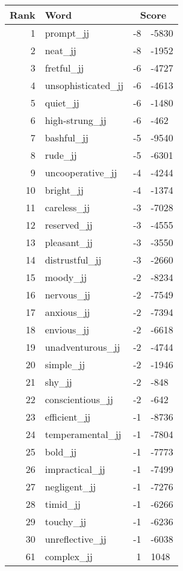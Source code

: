\begin{longtable}[!htbp]{| rlr@{.}l |}
    \hline
    \textbf{Rank} & \textbf{Word} & \multicolumn{2}{c|}{\textbf{Score}} \\
    \hline
    \endhead
    1 & prompt\_jj & -8 & -5830 \\
    2 & neat\_jj & -8 & -1952 \\
    3 & fretful\_jj & -6 & -4727 \\
    4 & unsophisticated\_jj & -6 & -4613 \\
    5 & quiet\_jj & -6 & -1480 \\
    6 & high-strung\_jj & -6 & -462 \\
    7 & bashful\_jj & -5 & -9540 \\
    8 & rude\_jj & -5 & -6301 \\
    9 & uncooperative\_jj & -4 & -4244 \\
    10 & bright\_jj & -4 & -1374 \\
    11 & careless\_jj & -3 & -7028 \\
    12 & reserved\_jj & -3 & -4555 \\
    13 & pleasant\_jj & -3 & -3550 \\
    14 & distrustful\_jj & -3 & -2660 \\
    15 & moody\_jj & -2 & -8234 \\
    16 & nervous\_jj & -2 & -7549 \\
    17 & anxious\_jj & -2 & -7394 \\
    18 & envious\_jj & -2 & -6618 \\
    19 & unadventurous\_jj & -2 & -4744 \\
    20 & simple\_jj & -2 & -1946 \\
    21 & shy\_jj & -2 & -848 \\
    22 & conscientious\_jj & -2 & -642 \\
    23 & efficient\_jj & -1 & -8736 \\
    24 & temperamental\_jj & -1 & -7804 \\
    25 & bold\_jj & -1 & -7773 \\
    26 & impractical\_jj & -1 & -7499 \\
    27 & negligent\_jj & -1 & -7276 \\
    28 & timid\_jj & -1 & -6266 \\
    29 & touchy\_jj & -1 & -6236 \\
    30 & unreflective\_jj & -1 & -6038 \\
    61 & complex\_jj & 1 & 1048 \\

\end{longtable}
